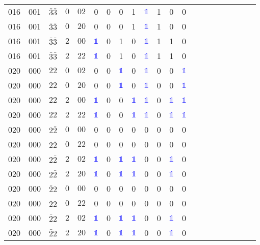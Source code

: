 \begin{longtable*}{c| cccccccccccccccccccc }
016& 001& $\bar{3}\bar{3}$& $0$& $02$& 0& 0& 0& 1& \textcolor{blue}{$\mathds{1}$}& 1& 0& 0\\
016& 001& $\bar{3}\bar{3}$& $0$& $20$& 0& 0& 0& 1& \textcolor{blue}{$\mathds{1}$}& 1& 0& 0\\
016& 001& $\bar{3}\bar{3}$& $2$& $00$& \textcolor{blue}{$\mathds{1}$}& 0& 1& 0& \textcolor{blue}{$\mathds{1}$}& 1& 1& 0\\
016& 001& $\bar{3}\bar{3}$& $2$& $22$& \textcolor{blue}{$\mathds{1}$}& 0& 1& 0& \textcolor{blue}{$\mathds{1}$}& 1& 1& 0\\
020& 000& $22$& $0$& $02$& 0& 0& \textcolor{blue}{$\mathds{1}$}& 0& \textcolor{blue}{$\mathds{1}$}& 0& 0& \textcolor{blue}{$\mathds{1}$}\\
020& 000& $22$& $0$& $20$& 0& 0& \textcolor{blue}{$\mathds{1}$}& 0& \textcolor{blue}{$\mathds{1}$}& 0& 0& \textcolor{blue}{$\mathds{1}$}\\
020& 000& $22$& $2$& $00$& \textcolor{blue}{$\mathds{1}$}& 0& 0& \textcolor{blue}{$\mathds{1}$}& \textcolor{blue}{$\mathds{1}$}& 0& \textcolor{blue}{$\mathds{1}$}& \textcolor{blue}{$\mathds{1}$}\\
020& 000& $22$& $2$& $22$& \textcolor{blue}{$\mathds{1}$}& 0& 0& \textcolor{blue}{$\mathds{1}$}& \textcolor{blue}{$\mathds{1}$}& 0& \textcolor{blue}{$\mathds{1}$}& \textcolor{blue}{$\mathds{1}$}\\
020& 000& $2\bar{2}$& $0$& $00$& 0& 0& 0& 0& 0& 0& 0& 0\\
020& 000& $2\bar{2}$& $0$& $22$& 0& 0& 0& 0& 0& 0& 0& 0\\
020& 000& $2\bar{2}$& $2$& $02$& \textcolor{blue}{$\mathds{1}$}& 0& \textcolor{blue}{$\mathds{1}$}& \textcolor{blue}{$\mathds{1}$}& 0& 0& \textcolor{blue}{$\mathds{1}$}& 0\\
020& 000& $2\bar{2}$& $2$& $20$& \textcolor{blue}{$\mathds{1}$}& 0& \textcolor{blue}{$\mathds{1}$}& \textcolor{blue}{$\mathds{1}$}& 0& 0& \textcolor{blue}{$\mathds{1}$}& 0\\
020& 000& $\bar{2}2$& $0$& $00$& 0& 0& 0& 0& 0& 0& 0& 0\\
020& 000& $\bar{2}2$& $0$& $22$& 0& 0& 0& 0& 0& 0& 0& 0\\
020& 000& $\bar{2}2$& $2$& $02$& \textcolor{blue}{$\mathds{1}$}& 0& \textcolor{blue}{$\mathds{1}$}& \textcolor{blue}{$\mathds{1}$}& 0& 0& \textcolor{blue}{$\mathds{1}$}& 0\\
020& 000& $\bar{2}2$& $2$& $20$& \textcolor{blue}{$\mathds{1}$}& 0& \textcolor{blue}{$\mathds{1}$}& \textcolor{blue}{$\mathds{1}$}& 0& 0& \textcolor{blue}{$\mathds{1}$}& 0\\

\end{longtable*}
